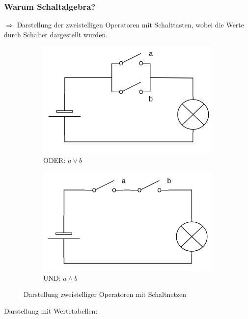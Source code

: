 \documentclass[10pt,a4paper]{scrartcl}
\begin{document}
\subsubsection{Warum Schaltalgebra?}
$\Rightarrow$ Darstellung der zweistelligen Operatoren mit Schalttasten, wobei die Werte durch Schalter dargestellt wurden.

\begin{figure}[h]
	\centering
	\begin{subfigure}{.5\textwidth}
		\centering
		\includegraphics[width=0.8\linewidth]{img/schaltnetz_oder}
		\caption{ODER: $a \vee b$}
		\label{fig:sub1}
	\end{subfigure}%
	\begin{subfigure}{.5\textwidth}
		\centering
		\includegraphics[width=.8\linewidth]{img/schaltnetz_und}
		\caption{UND: $a \wedge b$}
		\label{fig:sub2}
	\end{subfigure}
	\caption{Darstellung zweistelliger Operatoren mit Schaltnetzen}
	\label{fig:test}
\end{figure}

Darstellung mit Wertetabellen:\\
\end{document}
